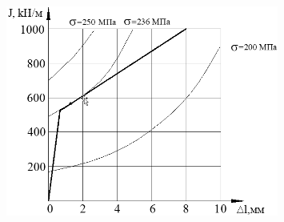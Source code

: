 \begin{figure}[H]
	\centering
	\includegraphics[width=0.8\textwidth]{assets/1204}
	\caption*{}
\end{figure}

